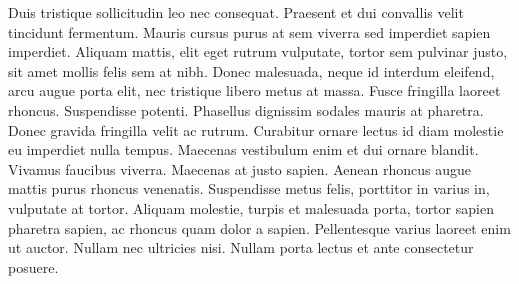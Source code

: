 % 
Duis tristique  sollicitudin leo nec consequat. Praesent et dui convallis velit tincidunt fermentum. Mauris cursus purus at sem viverra sed imperdiet sapien imperdiet. Aliquam mattis, elit eget rutrum vulputate, tortor sem pulvinar justo, sit amet mollis felis sem at nibh. Donec malesuada, neque id interdum eleifend, arcu augue porta elit, nec tristique libero metus at massa. Fusce fringilla laoreet rhoncus. Suspendisse potenti. Phasellus dignissim sodales mauris at pharetra. Donec gravida fringilla velit ac rutrum. Curabitur ornare lectus id diam molestie eu imperdiet nulla tempus. Maecenas vestibulum enim et dui ornare blandit. Vivamus  faucibus viverra. Maecenas at justo sapien. Aenean rhoncus augue mattis purus rhoncus venenatis. Suspendisse metus felis, porttitor in varius in, vulputate at tortor. Aliquam molestie, turpis et malesuada porta, tortor sapien pharetra sapien, ac rhoncus quam dolor a sapien. Pellentesque varius laoreet enim ut auctor. Nullam nec ultricies nisi. Nullam porta lectus et ante consectetur posuere. 